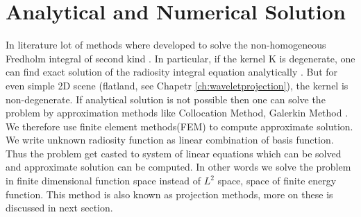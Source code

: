 \section{Analytical and Numerical Solution}
In literature lot of methods where developed to solve the non-homogeneous Fredholm integral of second kind \cite{iesurvey} \cite{ie}. In particular, if the kernel K is degenerate, one can find exact solution of the radiosity integral equation analytically \cite{ie}. But for even simple 2D  scene (flatland, see Chapetr \ref{ch:waveletprojection}), the kernel is non-degenerate. If analytical solution is not possible then one can solve the problem by approximation methods like Collocation Method, Galerkin Method \cite{iesurvey} \cite{ie}. We therefore use finite element methods(FEM) to compute approximate solution. We write unknown radiosity function as linear combination of basis function. Thus the problem get casted to system of linear equations which can be solved and approximate solution can be computed. In other words we solve the problem in finite dimensional function space instead of $L^2$ space, space of finite energy function. This method is also known as projection methods, more on these is discussed in next section.

